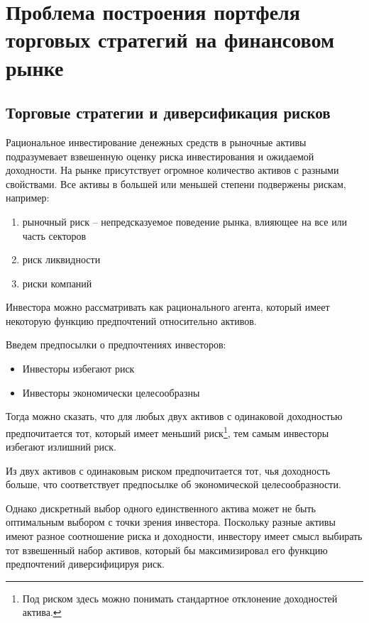 \chapter{Проблема построения портфеля торговых стратегий на финансовом рынке}
\section{Торговые стратегии и диверсификация рисков}
Рациональное инвестирование денежных средств в рыночные активы подразумевает взвешенную оценку риска инвестирования и ожидаемой доходности. 
На рынке присутствует огромное количество активов с разными свойствами. Все активы в большей или меньшей степени подвержены рискам, например:
\begin{enumerate}
	\item рыночный риск -- непредсказуемое поведение рынка, влияющее на все или часть секторов
	\item риск ликвидности
	\item риски компаний
\end{enumerate}
Инвестора можно рассматривать как рационального агента, который имеет некоторую функцию предпочтений относительно активов.

Введем предпосылки о предпочтениях инвесторов:
\begin{itemize}
	\item Инвесторы избегают риск
	\item Инвесторы экономически целесообразны
\end{itemize}
Тогда можно сказать, что для любых двух активов с одинаковой доходностью предпочитается тот, который имеет меньший риск\footnote{Под риском здесь можно понимать стандартное отклонение доходностей актива.}, тем самым инвесторы избегают излишний риск.  

Из двух активов с одинаковым риском предпочитается тот, чья доходность больше, что соответствует предпосылке об экономической целесообразности.

Однако дискретный выбор одного единственного актива может не быть оптимальным выбором с точки зрения инвестора. Поскольку разные активы имеют разное соотношение риска и доходности, инвестору имеет смысл выбирать тот взвешенный набор активов, который бы максимизировал его функцию предпочтений диверсифицируя риск.

